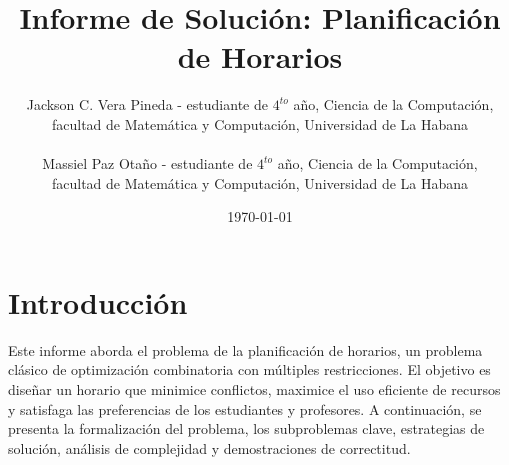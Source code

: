 \documentclass[12pt, a4paper]{article}
\title{Informe de Solución: Planificación de Horarios}
\author{Jackson C. Vera Pineda - estudiante de $4^{to}$ año, Ciencia de la Computación, \\
		facultad de Matemática y Computación, Universidad de La Habana\\\\
		Massiel Paz Otaño - estudiante de $4^{to}$ año, Ciencia de la Computación, \\
		facultad de Matemática y Computación, Universidad de La Habana}
\date{\today}
\begin{document}
\maketitle

\section{Introducción}
Este informe aborda el problema de la planificación de horarios, un problema clásico de optimización combinatoria con múltiples restricciones. El objetivo es diseñar un horario que minimice conflictos, maximice el uso eficiente de recursos y satisfaga las preferencias de los estudiantes y profesores. A continuación, se presenta la formalización del problema, los subproblemas clave, estrategias de solución, análisis de complejidad y demostraciones de correctitud.
\end{document}
